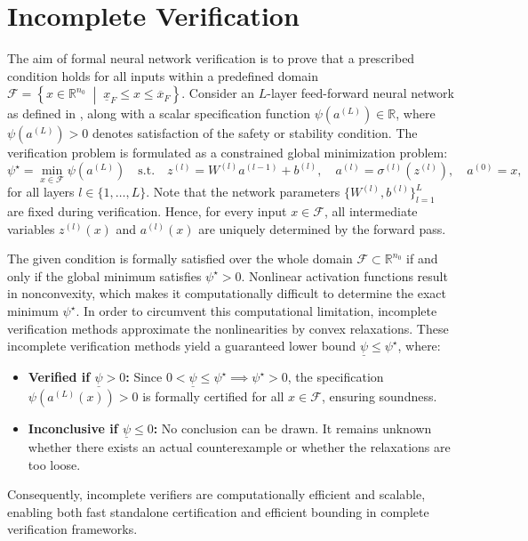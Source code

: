 \section{Incomplete Verification}
\label{sec:incom-verification}
The aim of formal neural network verification is to prove that a prescribed condition holds for all inputs within 
a predefined domain $\mathcal{F} = \left\{ x \in \mathbb{R}^{n_0} \;\middle|\; \underline{x}_F \le x \le \overline{x}_F \right\}$. 
Consider an $L$-layer feed-forward neural network as defined in , 
along with a scalar specification function $\psi(a^{(L)}) \in \mathbb{R}$, where $\psi(a^{(L)}) > 0$ 
denotes satisfaction of the safety or stability condition. 
The verification problem is formulated as a constrained global minimization problem:
\begin{equation}
    \label{eq:verification-problem}
    \psi^\star = \min_{x \in \mathcal{F}} \psi(a^{(L)}) 
    \quad \text{s.t.} 
    \quad z^{(l)} = W^{(l)} a^{(l-1)} + b^{(l)}, \quad a^{(l)} = \sigma^{(l)}\!\left(z^{(l)}\right), \quad a^{(0)} = x,  
\end{equation}
for all layers $l \in \{1, \dots, L\}$. Note that the network parameters $\{W^{(l)}, b^{(l)}\}_{l=1}^L$ are fixed during
verification. Hence, for every input $x \in \mathcal{F}$, all intermediate variables $z^{(l)}(x)$ and $a^{(l)}(x)$ 
are uniquely determined by the forward pass.

The given condition is formally satisfied over the whole domain $\mathcal{F} \subset \mathbb{R}^{n_0}$ if and only if 
the global minimum satisfies $\psi^\star > 0$. Nonlinear activation functions result in nonconvexity, 
which makes it computationally difficult to determine the exact minimum $\psi^\star$. 
In order to circumvent this computational limitation, incomplete verification methods approximate the nonlinearities 
by convex relaxations.
These incomplete verification methods yield a guaranteed lower bound $\underline{\psi} \le \psi^\star$, where:
\begin{itemize}
    \item \textbf{Verified if $\underline{\psi} > 0$: } Since $0 < \underline{\psi} \le \psi^\star \implies \psi^\star > 0$, 
        the specification $\psi(a^{(L)}(x)) > 0$ is formally certified for all $x \in \mathcal{F}$, ensuring soundness. 
    \item \textbf{Inconclusive if $\underline{\psi} \le 0$:} No conclusion can be drawn.
        It remains unknown whether there exists an actual counterexample or whether the relaxations are too loose. 
\end{itemize}
Consequently, incomplete verifiers are computationally efficient and scalable, 
enabling both fast standalone certification and efficient bounding in complete verification frameworks. 




